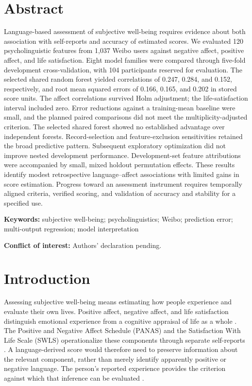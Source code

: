 

\section{Abstract}
Language-based assessment of subjective well-being requires evidence about both association with self-reports and accuracy of estimated scores. We evaluated 120 psycholinguistic features from 1,037 Weibo users against negative affect, positive affect, and life satisfaction. Eight model families were compared through five-fold development cross-validation, with 104 participants reserved for evaluation. The selected shared random forest yielded correlations of 0.247, 0.284, and 0.152, respectively, and root mean squared errors of 0.166, 0.165, and 0.202 in stored score units. The affect correlations survived Holm adjustment; the life-satisfaction interval included zero. Error reductions against a training-mean baseline were small, and the planned paired comparisons did not meet the multiplicity-adjusted criterion. The selected shared forest showed no established advantage over independent forests. Record-selection and feature-exclusion sensitivities retained the broad predictive pattern. Subsequent exploratory optimization did not improve nested development performance. Development-set feature attributions were accompanied by small, mixed holdout permutation effects. These results identify modest retrospective language--affect associations with limited gains in score estimation. Progress toward an assessment instrument requires temporally aligned criteria, verified scoring, and validation of accuracy and stability for a specified use.

\noindent\textbf{Keywords:} subjective well-being; psycholinguistics; Weibo; prediction error; multi-output regression; model interpretation

\noindent\textbf{Conflict of interest:} Authors' declaration pending.

\section{Introduction}
Assessing subjective well-being means estimating how people experience and evaluate their own lives. Positive affect, negative affect, and life satisfaction distinguish emotional experience from a cognitive appraisal of life as a whole \citep{diener1984}. The Positive and Negative Affect Schedule (PANAS) and the Satisfaction With Life Scale (SWLS) operationalize these components through separate self-reports \citep{diener1985,watson1988}. A language-derived score would therefore need to preserve information about the relevant component, rather than merely identify apparently positive or negative language. The person's reported experience provides the criterion against which that inference can be evaluated \citep{diener2018}.

